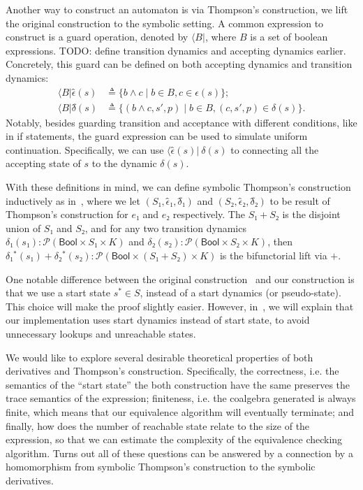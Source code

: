 \documentclass[conference]{IEEEtran}
\newcommand{\theoryOf}[1]{\ensuremath{\mathsf{#1}}}
\newcommand{\Bool}{\theoryOf{Bool}}
\begin{document}
Another way to construct an automaton is via Thompson's construction, we lift the original construction to the symbolic setting.
A common expression to construct is a guard operation, denoted by \(⟨B|\), where \(B\) is a set of boolean expressions.
TODO: define transition dynamics and accepting dynamics earlier.
Concretely, this guard can be defined on both accepting dynamics and transition dynamics:
\begin{align*}
    ⟨B|ϵ̂(s) & ≜ \{b ∧ c ∣ b ∈ B, c ∈ ϵ(s)\}; \\
    ⟨B|δ̂(s) & ≜ \{(b ∧ c, s', p) ∣ b ∈ B, (c, s', p) ∈ δ(s)\}.
\end{align*}
Notably, besides guarding transition and acceptance with different conditions, like in if statements, the guard expression can be used to simulate uniform continuation. Specifically, we can use \(⟨ϵ̂(s)|~δ(s)\) to connecting all the accepting state of \(s\) to the dynamic \(δ(s)\).

With these definitions in mind, we can define symbolic Thompson's construction inductively as in~, where we let \((S₁, ϵ̂₁, δ̂₁)\) and \((S₂, ϵ̂₂, δ̂₂)\) to be result of Thompson's construction for \(e₁\) and \(e₂\) respectively.
The \(S₁ + S₂\) is the disjoint union of \(S₁\) and \(S₂\), and for any two transition dynamics \(δ₁(s₁): 𝒫(\Bool × S₁ × K)\) and \(δ₂(s₂): 𝒫(\Bool × S₂ × K)\), then \(δ₁^*(s₁) + δ₂^*(s₂): 𝒫(\Bool × (S₁ + S₂) × K)\) is the bifunctorial lift via \(+\).

One notable difference between the original construction~\cite{smolka_GuardedKleeneAlgebra_2020} and our construction is that we use a start state \(s^* ∈ S\), instead of a start dynamics (or pseudo-state).
This choice will make the proof slightly easier. 
However, in~, we will explain that our implementation uses start dynamics instead of start state, to avoid unnecessary lookups and unreachable states.

We would like to explore several desirable theoretical properties of both derivatives and Thompson's construction.
Specifically, the correctness, i.e. the semantics of the ``start state'' the both construction have the same preserves the trace semantics of the expression; finiteness, i.e. the coalgebra generated is always finite, which means that our equivalence algorithm will eventually terminate; and finally, how does the number of reachable state relate to the size of the expression, so that we can estimate the complexity of the equivalence checking algorithm.
Turns out all of these questions can be answered by a connection by a homomorphism from symbolic Thompson's construction to the symbolic derivatives.
\end{document}

